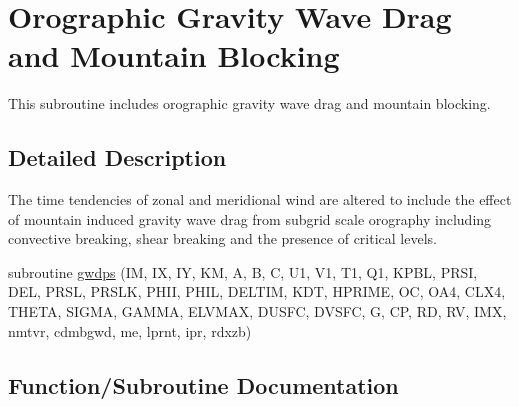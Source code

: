 \hypertarget{group__orographic}{}\section{Orographic Gravity Wave Drag and Mountain Blocking}
\label{group__orographic}


This subroutine includes orographic gravity wave drag and mountain blocking.  




\subsection{Detailed Description}
The time tendencies of zonal and meridional wind are altered to include the effect of mountain induced gravity wave drag from subgrid scale orography including convective breaking, shear breaking and the presence of critical levels. \begin{DoxyCompactItemize}
\item 
subroutine \hyperlink{group__orographic_ga82eda62e1bdee0a0ab6a831fc53ae89c}{gwdps} (IM, IX, IY, KM, A, B, C, U1, V1, T1, Q1, K\+P\+BL, P\+R\+SI, D\+EL, P\+R\+SL, P\+R\+S\+LK, P\+H\+II, P\+H\+IL, D\+E\+L\+T\+IM, K\+DT, H\+P\+R\+I\+ME, OC, O\+A4, C\+L\+X4, T\+H\+E\+TA, S\+I\+G\+MA, G\+A\+M\+MA, E\+L\+V\+M\+AX, D\+U\+S\+FC, D\+V\+S\+FC, G, CP, RD, RV, I\+MX, nmtvr, cdmbgwd, me, lprnt, ipr, rdxzb)
\end{DoxyCompactItemize}


\subsection{Function/\+Subroutine Documentation}
\mbox{\label{group__orographic_ga82eda62e1bdee0a0ab6a831fc53ae89c}} 
